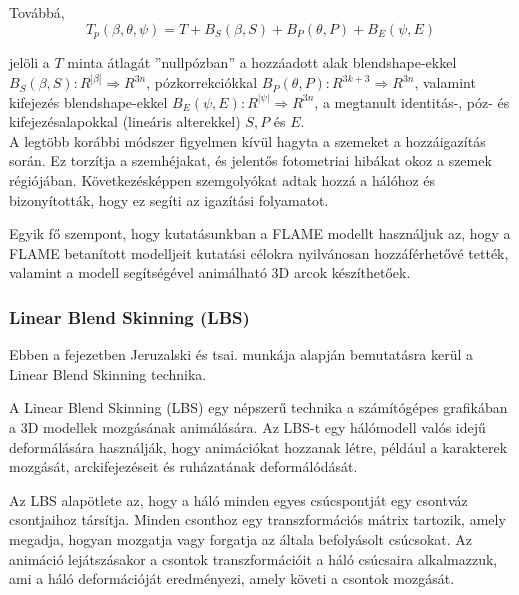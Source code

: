 \documentclass[12pt,a4]{article}
\begin{document}
                Továbbá, 
                \begin{equation*}
                    T_{p}(\beta, \theta, \psi) = T + B_{S}(\beta, S) + B_{P}(\theta, P) + B_{E}(\psi, E)
                \end{equation*}

                jelöli a $T$ minta átlagát ”nullpózban” a hozzáadott alak blendshape-ekkel $B_{S} (\beta, S) : R^{|\beta|} \Rightarrow R^{3n}$, pózkorrekciókkal $B_{P}(\theta, P) : R^{3k+3} \Rightarrow R^{3n}$, valamint kifejezés blendshape-ekkel $B_{E}(\psi, E) : R^{|\psi|} \Rightarrow R^{3n}$, a megtanult identitás-, póz- és kifejezésalapokkal (lineáris alterekkel) $S, P$ és $E$. \\

                A legtöbb korábbi módszer figyelmen kívül hagyta a szemeket a
                hozzáigazítás során. Ez torzítja a szemhéjakat, és jelentős fotometriai hibákat okoz a szemek régiójában. Következésképpen szemgolyókat adtak hozzá a hálóhoz és bizonyították, hogy ez segíti az igazítási folyamatot.

                Egyik fő szempont, hogy kutatásunkban a FLAME modellt használjuk az, hogy a FLAME betanított modelljeit kutatási célokra nyilvánosan hozzáférhetővé tették, valamint a modell segítségével animálható 3D arcok készíthetőek.

            \subsubsection{Linear Blend Skinning (LBS)}

                Ebben a fejezetben Jeruzalski és tsai. \cite{lbs} munkája alapján bemutatásra kerül a Linear Blend Skinning technika.

                A Linear Blend Skinning (LBS) egy népszerű technika a számítógépes grafikában a 3D modellek mozgásának animálására. Az LBS-t egy hálómodell valós idejű deformálására használják, hogy animációkat hozzanak létre, például a karakterek mozgását, arckifejezéseit és ruházatának deformálódását.

                Az LBS alapötlete az, hogy a háló minden egyes csúcspontját egy csontváz csontjaihoz társítja. Minden csonthoz egy transzformációs mátrix tartozik, amely megadja, hogyan mozgatja vagy forgatja az általa befolyásolt csúcsokat. Az animáció lejátszásakor a csontok transzformációit a háló csúcsaira alkalmazzuk, ami a háló deformációját eredményezi, amely követi a csontok mozgását.
                
\end{document}
